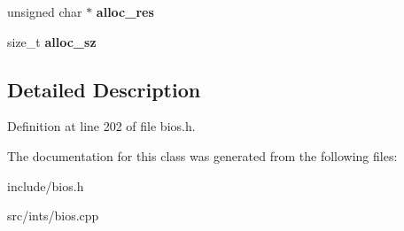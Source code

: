 \begin{DoxyCompactItemize}
\item 
\hypertarget{classISAPnPDevice_ab7645d92be95729a5f745d0735342296}{unsigned char $\ast$ {\bfseries alloc\-\_\-res}}\label{classISAPnPDevice_ab7645d92be95729a5f745d0735342296}

\item 
\hypertarget{classISAPnPDevice_ae872e27861732e57001057215332f53f}{size\-\_\-t {\bfseries alloc\-\_\-sz}}\label{classISAPnPDevice_ae872e27861732e57001057215332f53f}

\end{DoxyCompactItemize}


\subsection{Detailed Description}


Definition at line 202 of file bios.\-h.



The documentation for this class was generated from the following files\-:\begin{DoxyCompactItemize}
\item 
include/bios.\-h\item 
src/ints/bios.\-cpp\end{DoxyCompactItemize}
